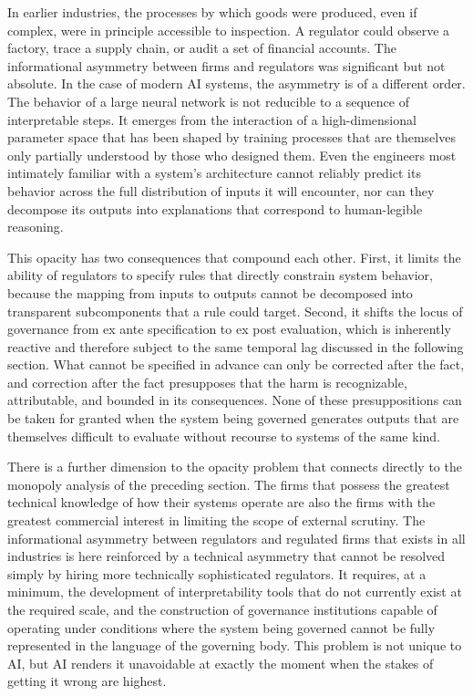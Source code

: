 \documentclass[11pt, a4paper]{article}
\theoremstyle{plain}
\theoremstyle{definition}
\begin{document}
In earlier industries, the processes by which goods were produced, even if
complex, were in principle accessible to inspection. A regulator could observe
a factory, trace a supply chain, or audit a set of financial accounts. The
informational asymmetry between firms and regulators was significant but not
absolute. In the case of modern AI systems, the asymmetry is of a different
order. The behavior of a large neural network is not reducible to a sequence
of interpretable steps. It emerges from the interaction of a high-dimensional
parameter space that has been shaped by training processes that are themselves
only partially understood by those who designed them. Even the engineers most
intimately familiar with a system's architecture cannot reliably predict its
behavior across the full distribution of inputs it will encounter, nor can they
decompose its outputs into explanations that correspond to human-legible
reasoning.

This opacity has two consequences that compound each other. First, it limits
the ability of regulators to specify rules that directly constrain system
behavior, because the mapping from inputs to outputs cannot be decomposed into
transparent subcomponents that a rule could target. Second, it shifts the
locus of governance from ex ante specification to ex post evaluation, which
is inherently reactive and therefore subject to the same temporal lag discussed
in the following section. What cannot be specified in advance can only be
corrected after the fact, and correction after the fact presupposes that the
harm is recognizable, attributable, and bounded in its consequences. None of
these presuppositions can be taken for granted when the system being governed
generates outputs that are themselves difficult to evaluate without recourse
to systems of the same kind.

There is a further dimension to the opacity problem that connects directly to
the monopoly analysis of the preceding section. The firms that possess the
greatest technical knowledge of how their systems operate are also the firms
with the greatest commercial interest in limiting the scope of external
scrutiny. The informational asymmetry between regulators and regulated firms
that exists in all industries is here reinforced by a technical asymmetry that
cannot be resolved simply by hiring more technically sophisticated regulators.
It requires, at a minimum, the development of interpretability tools that do
not currently exist at the required scale, and the construction of governance
institutions capable of operating under conditions where the system being
governed cannot be fully represented in the language of the governing body.
This problem is not unique to AI, but AI renders it unavoidable at exactly the
moment when the stakes of getting it wrong are highest.
\end{document}
